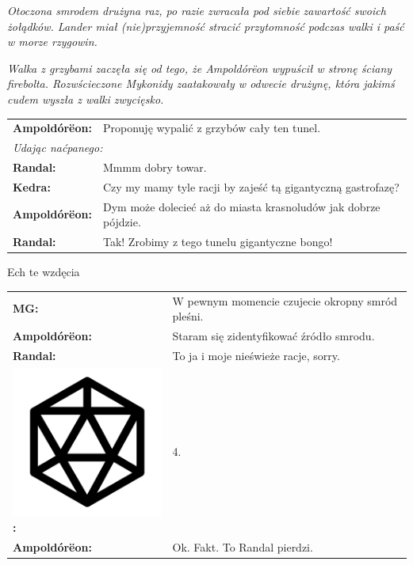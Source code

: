 \documentclass[10pt,twoside,twocolumn]{book}
\begin{document}
\begin{rpg-quotebox}{}
   \textit{Otoczona smrodem drużyna raz, po razie zwracała pod siebie zawartość swoich żołądków. Lander miał (nie)przyjemność stracić przytomność podczas walki i paść w morze rzygowin.}\\
\end{rpg-quotebox}


\begin{rpg-quotebox}{}
   \textit{Walka z grzybami zaczęła się od tego, że Ampoldórëon wypuścił w stronę ściany firebolta. Rozwścieczone Mykonidy zaatakowały w odwecie drużynę, która jakimś cudem wyszła z walki zwycięsko.}\\

   \begin{tabularx}{\columnwidth}{lX}
      \textbf{Ampoldórëon:} & Proponuję wypalić z grzybów cały ten tunel.\\
      \multicolumn{2}{l}{\textit{Udając naćpanego:}}\\
      \textbf{Randal:} & Mmmm dobry towar.\\
      \textbf{Kedra:} & Czy my mamy tyle racji by zajeść tą gigantyczną gastrofazę?\\
      \textbf{Ampoldórëon:} & Dym może dolecieć aż do miasta krasnoludów jak dobrze pójdzie.\\
      \textbf{Randal:} & Tak! Zrobimy z tego tunelu gigantyczne bongo!\\
   \end{tabularx}
\end{rpg-quotebox}


\begin{rpg-quotebox}{Ech te wzdęcia}
   \begin{tabularx}{\columnwidth}{lX}
      \textbf{MG:} & W pewnym momencie czujecie okropny smród pleśni.\\
      \textbf{Ampoldórëon:} & Staram się zidentyfikować źródło smrodu.\\
      \textbf{Randal:} & To ja i moje nieświeże racje, sorry.\\
      \includegraphics[scale=0.055]{img/d20.png}\textbf{:}& 4.\\
      \textbf{Ampoldórëon:} & Ok. Fakt. To Randal pierdzi.\\
   \end{tabularx}
\end{rpg-quotebox}
\end{document}
